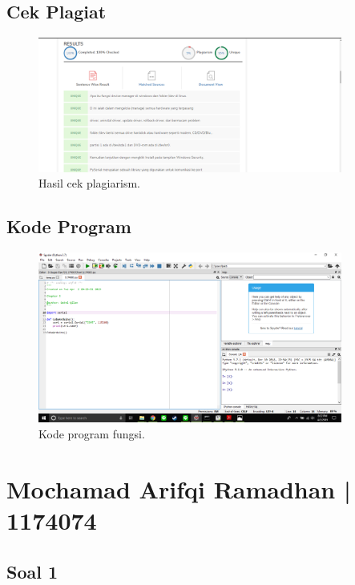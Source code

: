\subsection{Cek Plagiat}
\begin{figure}[H]
	\includegraphics[width=10cm]{figures/5/1174083/Teori/plagiat1.png}
	\centering
	\caption{Hasil cek plagiarism.}
\end{figure}

\subsection{Kode Program}
\begin{figure}[ht]
	\includegraphics[width=10cm]{figures/5/1174083/Teori/kodefungsi.png}
	\centering
	\caption{Kode program fungsi.}
\end{figure}

\section{Mochamad Arifqi Ramadhan | 1174074}
\subsection{Soal 1}

